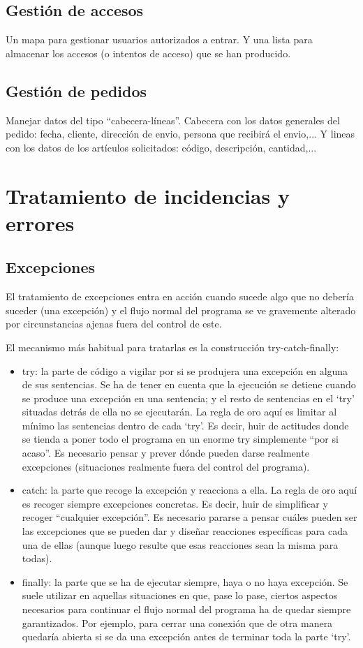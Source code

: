 \documentclass[spanish,12pt,a4paper,final,oneside]{book}
\begin{document}
\section{Gestión de accesos}
Un mapa para gestionar usuarios autorizados a entrar. Y una lista para almacenar los accesos (o intentos de acceso) que se han producido.

\section{Gestión de pedidos}
Manejar datos del tipo “cabecera-líneas”. Cabecera con los datos generales del pedido: fecha, cliente, dirección de envio, persona que recibirá el envio,... Y lineas con los datos de los artículos solicitados: código, descripción, cantidad,...


\chapter{Tratamiento de incidencias y errores}

\section{Excepciones}
El tratamiento de excepciones entra en acción cuando sucede algo que no debería suceder (una excepción) y el flujo normal del programa se ve gravemente alterado por circunstancias ajenas fuera del control de este.

El mecanismo más habitual para tratarlas es la construcción try-catch-finally:
\begin{itemize}
\item try: la parte de código a vigilar por si se produjera una excepción en alguna de sus sentencias.
Se ha de tener en cuenta que la ejecución se detiene cuando se produce una excepción en una sentencia; y el resto de sentencias en el ‘try’ situadas detrás de ella no se ejecutarán.
La regla de oro aquí es limitar al mínimo las sentencias dentro de cada ‘try’. Es decir, huir de actitudes donde se tienda a poner todo el programa en un enorme try simplemente “por si acaso”. Es necesario pensar y prever dónde pueden darse realmente excepciones (situaciones realmente fuera del control del programa).
\item catch: la parte que recoge la excepción y reacciona a ella.
La regla de oro aquí es recoger siempre excepciones concretas. Es decir, huir de simplificar y recoger “cualquier excepción”. Es necesario pararse a pensar cuáles pueden ser las excepciones que se pueden dar y diseñar reacciones específicas para cada una de ellas (aunque luego resulte que esas reacciones sean la misma para todas).
\item finally: la parte que se ha de ejecutar siempre, haya o no haya excepción.
Se suele utilizar en aquellas situaciones en que, pase lo pase, ciertos aspectos necesarios para continuar el flujo normal del programa ha de quedar siempre garantizados. Por ejemplo, para cerrar una conexión que de otra manera quedaría abierta si se da una excepción antes de terminar toda la parte ‘try’.
\end{itemize}
\end{document}
